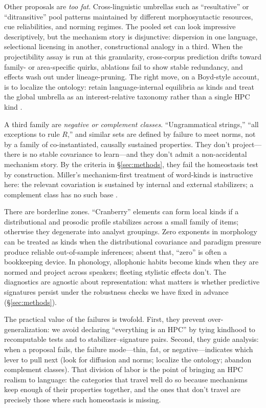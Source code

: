 \documentclass[12pt]{article}
\begin{document}
Other proposals are \emph{too fat}. Cross-linguistic umbrellas such as “resultative” or “ditransitive” pool patterns maintained by different morphosyntactic resources, cue reliabilities, and norming regimes. The pooled set can look impressive descriptively, but the mechanism story is disjunctive: dispersion in one language, selectional licensing in another, constructional analogy in a third. When the projectibility assay is run at this granularity, cross-corpus prediction drifts toward family- or area-specific quirks, ablations fail to show stable redundancy, and effects wash out under lineage-pruning. The right move, on a Boyd-style account, is to localize the ontology: retain language-internal equilibria as kinds and treat the global umbrella as an interest-relative taxonomy rather than a single \textsc{HPC} kind \citep{Boyd1991Enthusiasm,Boyd1999Homeostasis}.

A third family are \emph{negative or complement classes}. “Ungrammatical strings,” “all exceptions to rule $R$,” and similar sets are defined by failure to meet norms, not by a family of co-instantiated, causally sustained properties. They don't project—there is no stable covariance to learn—and they don't admit a non-accidental mechanism story. By the criteria in \S\ref{sec:methods}, they fail the homeostasis test by construction. Miller’s mechanism-first treatment of word-kinds is instructive here: the relevant covariation is sustained by internal and external stabilizers; a complement class has no such base \citep{Miller2021WordsSpeciesKinds}.

There are borderline zones. “Cranberry” elements can form local kinds if a distributional and prosodic profile stabilizes across a small family of items; otherwise they degenerate into analyst groupings. Zero exponents in morphology can be treated as kinds when the distributional covariance and paradigm pressure produce reliable out-of-sample inferences; absent that, “zero” is often a bookkeeping device. In phonology, allophonic habits become kinds when they are normed and project across speakers; fleeting stylistic effects don't. The diagnostics are agnostic about representation: what matters is whether predictive signatures persist under the robustness checks we have fixed in advance (\S\ref{sec:methods}).

The practical value of the failures is twofold. First, they prevent over-generalization: we avoid declaring “everything is an \textsc{HPC}” by tying kindhood to recomputable tests and to stabilizer–signature pairs. Second, they guide analysis: when a proposal fails, the failure mode—thin, fat, or negative—indicates which lever to pull next (look for diffusion and norms; localize the ontology; abandon complement classes). That division of labor is the point of bringing an \textsc{HPC} realism to language: the categories that travel well do so because mechanisms keep enough of their properties together, and the ones that don't travel are precisely those where such homeostasis is missing.
\end{document}
